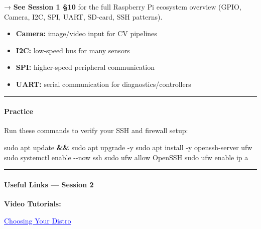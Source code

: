 \documentclass[
  english,
  paper=a4,
  oneside  ,captions=tableheading
]{scrartcl}
\newenvironment{Shaded}{}{}
\newcommand{\AttributeTok}[1]{\textcolor[rgb]{0.49,0.56,0.16}{#1}}
\newcommand{\ExtensionTok}[1]{#1}
\newcommand{\FunctionTok}[1]{\textcolor[rgb]{0.02,0.16,0.49}{#1}}
\newcommand{\KeywordTok}[1]{\textcolor[rgb]{0.00,0.44,0.13}{\textbf{#1}}}
\newcommand{\NormalTok}[1]{#1}
\providecommand{\tightlist}{%
  \setlength{\itemsep}{0pt}\setlength{\parskip}{0pt}}
\renewenvironment{quote}{\begin{customblockquote}\list{}{\rightmargin=0em\leftmargin=0em}%
\item\relax\color{blockquote-text}\ignorespaces}{\unskip\unskip\endlist\end{customblockquote}}
\begin{document}
\begin{quote}
→ \textbf{See Session 1 §10} for the full Raspberry Pi ecosystem
overview (GPIO, Camera, I2C, SPI, UART, SD-card, SSH patterns).
\end{quote}

\begin{itemize}
\tightlist
\item
  \textbf{Camera:} image/video input for CV pipelines
\item
  \textbf{I2C:} low-speed bus for many sensors
\item
  \textbf{SPI:} higher-speed peripheral communication
\item
  \textbf{UART:} serial communication for diagnostics/controllers
\end{itemize}

\begin{center}\rule{0.5\linewidth}{0.5pt}\end{center}

\paragraph{Practice}\label{practice}

Run these commands to verify your SSH and firewall setup:

\begin{Shaded}
\begin{Highlighting}[]
\FunctionTok{sudo}\NormalTok{ apt update }\KeywordTok{\&\&} \FunctionTok{sudo}\NormalTok{ apt upgrade }\AttributeTok{{-}y}
\FunctionTok{sudo}\NormalTok{ apt install }\AttributeTok{{-}y}\NormalTok{ openssh{-}server ufw}
\FunctionTok{sudo}\NormalTok{ systemctl enable }\AttributeTok{{-}{-}now}\NormalTok{ ssh}
\FunctionTok{sudo}\NormalTok{ ufw allow OpenSSH}
\FunctionTok{sudo}\NormalTok{ ufw enable}
\ExtensionTok{ip}\NormalTok{ a}
\end{Highlighting}
\end{Shaded}

\begin{center}\rule{0.5\linewidth}{0.5pt}\end{center}

\paragraph{Useful Links --- Session 2}\label{useful-links-session-2}

\textbf{Video Tutorials:}

%
  \par\vspace{0.5ex}%
  \href{https://youtu.be/8yVlJEzq2eg?si=SWcgh\_Bw51Li3lv6}{\textcolor{blue}{\underline{\faLink\quad Choosing Your Distro}}}%
  \par\vspace{0.5ex}%
\end{document}
